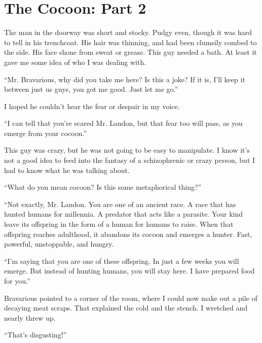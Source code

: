 \chapter{The Cocoon: Part 2} 


The man in the doorway was short and stocky. Pudgy even, though it
was hard to tell in his trenchcoat. His hair was thinning, and had
been clumsily combed to the side. His face shone from sweat or
grease. This guy needed a bath. At least it gave me some idea of
who I was dealing with.



``Mr. Bravarious, why did you take me here? Is this a joke? If
it is, I'll keep it between just us guys, you got me good.
Just let me go.''



I hoped he couldn't hear the fear or despair in my
voice.



``I can tell that you're scared Mr. Landon, but that
fear too will pass, as you emerge from your cocoon.''



This guy was crazy, but he was not going to be easy to manipulate.
I know it's not a good idea to feed into the fantasy of a
schizophrenic or crazy person, but I had to know what he was
talking about.



``What do you mean cocoon? Is this some metaphorical
thing?''



``Not exactly, Mr. Landon. You are one of an ancient race. A
race that has hunted humans for millennia. A predator that acts
like a parasite. Your kind leave its offspring in the form of a
human for humans to raise. When that offspring reaches adulthood,
it abandons its cocoon and emerges a hunter. Fast, powerful,
unstoppable, and hungry.



``I'm saying that you are one of these offspring. In just a
few weeks you will emerge. But instead of hunting humans, you will
stay here. I have prepared food for you.''



Bravarious pointed to a corner of the room, where I could now make
out a pile of decaying meat scraps. That explained the cold and the
stench. I wretched and nearly threw up.



``That's disgusting!''



